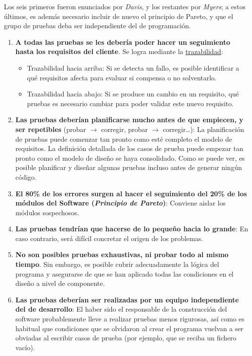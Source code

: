 Los seis primeros fueron enunciados por \textit{Davis}, y los restantes por \textit{Myers}; a estos últimos, es además necesario incluir de nuevo el principio de Pareto, y que el grupo de pruebas deba ser independiente del de programación.

\begin{enumerate}
    \item \textbf{A todas las pruebas se les debería poder hacer un seguimiento hasta los requisitos del cliente}. Se logra mediante la \uline{trazabilidad}:
    \begin{itemize}
        \item Trazabilidad hacia arriba: Si se detecta un fallo, es posible identificar a qué requisitos afecta para evaluar si compensa o no solventarlo.
        \item Trazabilidad hacia abajo: Si se produce un cambio en un requisito, qué pruebas es necesario cambiar para poder validar este nuevo requisito.
    \end{itemize}
    \item \textbf{Las pruebas deberían planificarse mucho antes de que empiecen, y ser repetibles} (probar $\rightarrow$ corregir, probar $\rightarrow$ corregir\ldots): La planificación de pruebas puede comenzar tan pronto como esté completo el modelo de requisitos. La definición detallada de los casos de prueba puede empezar tan pronto como el modelo de diseño se haya consolidado. Como se puede ver, es posible planificar y diseñar algunas pruebas incluso antes de generar ningún código.
    \item \textbf{El 80\% de los errores surgen al hacer el seguimiento del 20\% de los módulos del Software (\textit{Principio de Pareto})}: Conviene aislar los módulos sospechosos.
    \item \textbf{Las pruebas tendrían que hacerse de lo pequeño hacia lo grande}: En caso contrario, será difícil concretar el origen de los problemas.
    \item \textbf{No son posibles pruebas exhaustivas, ni probar todo al mismo tiempo}. Sin embargo, es posible cubrir adecuadamente la lógica del programa y asegurarse de que se han aplicado todas las condiciones en el diseño a nivel de componente.
    \item \textbf{Las pruebas deberían ser realizadas por un equipo independiente del de desarrollo}: El haber sido el responsable de la construcción del software probablemente lleve a realizar pruebas menos rigurosas, así como es habitual que condiciones que se olvidaron al crear el programa vuelvan a ser obviadas al escribir casos de prueba (por ejemplo, que se reciba un fichero vacío).

\end{enumerate}
